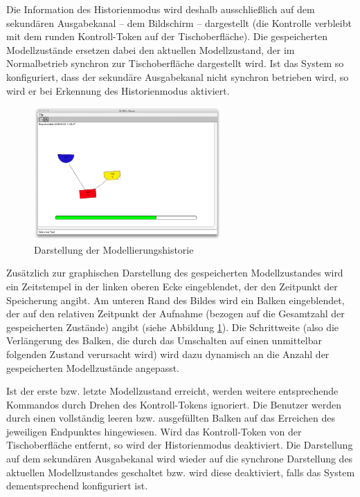 Die Information des Historienmodus wird deshalb ausschließlich auf dem sekundären Ausgabekanal -- dem Bildschirm -- dargestellt (die Kontrolle verbleibt mit dem runden Kontroll-Token auf der Tischoberfläche). Die gespeicherten Modellzustände ersetzen dabei den aktuellen Modellzustand, der im Normalbetrieb synchron zur Tischoberfläche dargestellt wird. Ist das System so konfiguriert, dass der sekundäre Ausgabekanal nicht synchron betrieben wird, so wird er bei Erkennung des Historienmodus aktiviert.

\begin{figure}[htbp]
	\centering
		\includegraphics[height=2in]{img/SystemNeu/HistoryScreen.png}
	\caption{Darstellung der Modellierungshistorie}
	\label{fig:img_SystemNeu_HistoryScreen}
\end{figure}

Zusätzlich zur graphischen Darstellung des gespeicherten Modellzustandes wird ein Zeitstempel in der linken oberen Ecke eingeblendet, der den Zeitpunkt der Speicherung angibt. Am unteren Rand des Bildes wird ein Balken eingeblendet, der auf den relativen Zeitpunkt der Aufnahme (bezogen auf die Gesamtzahl der gespeicherten Zustände) angibt (siehe Abbildung \ref{fig:img_SystemNeu_HistoryScreen}). Die Schrittweite (also die Verlängerung des Balken, die durch das Umschalten auf einen unmittelbar folgenden Zustand verursacht wird) wird dazu dynamisch an die Anzahl der gespeicherten Modellzustände angepasst.

Ist der erste bzw. letzte Modellzustand erreicht, werden weitere entsprechende Kommandos durch Drehen des Kontroll-Tokens ignoriert. Die Benutzer werden durch einen vollständig leeren bzw. ausgefüllten Balken auf das Erreichen des jeweiligen Endpunktes hingewiesen. Wird das Kontroll-Token von der Tischoberfläche entfernt, so wird der Historienmodus deaktiviert. Die Darstellung auf dem sekundären Ausgabekanal wird wieder auf die synchrone Darstellung des aktuellen Modellzustandes geschaltet bzw. wird diese deaktiviert, falls das System dementsprechend konfiguriert ist.

